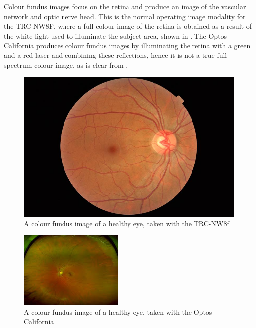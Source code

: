 Colour fundus images focus on the retina and produce an image of the vascular
network and optic nerve head. This is the normal operating image modality for
the TRC-NW8F, where a full colour image of the retina is obtained as a result
of the white light used to illuminate the subject area, shown in .
The Optos California produces colour fundus images by illuminating the retina
with a green and a red laser and combining these reflections, hence it is not
a true full spectrum colour image, as is clear from .

\begin{figure}[H]
\centering
\includegraphics{figures/colourtrc}
\caption{A colour fundus image of a healthy eye, taken with the TRC-NW8f}
\label{fig:cf}
   \end{figure}

\begin{figure}[H]
\centering
\includegraphics{figures/optoscolour}
\caption{A colour fundus image of a healthy eye, taken with the Optos California}
\label{fig:cfoptos}
   \end{figure}


